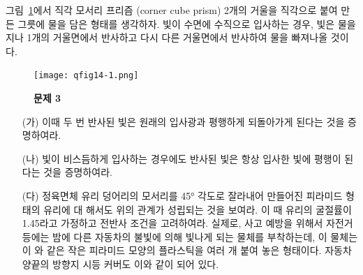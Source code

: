 \documentclass[tightenlines,floatfix,nofootinbib,superscriptaddress,fleqn]{revtex4-2}
\begin{document}
그림~\ref{fig:1}에서 직각 모서리 프리즘 (corner cube prism) 2개의 거울을
직각으로 붙여 만든 그릇에 물을 담은 형태를 생각하자. 빛이 수면에
수직으로 입사하는 경우, 빛은 물을 지나 1개의 거울면에서 반사하고 다시
다른 거울면에서 반사하여 물을 빠져나올 것이다.
 \begin{figure}[htp]
   \centering
   \texttt{[image: qfig14-1.png]}
   \caption{\textbf{문제 3}}
   \label{fig:1}
 \end{figure}
\begin{itemize}
\item[(가)] 이때 두 번 반사된 빛은 원래의 입사광과 평행하게 되돌아가게
  된다는 것을 증명하여라.
\item[(나)] 빛이 비스듬하게 입사하는 경우에도 반사된 빛은 항상 입사한
  빛에 평행이 된다는 것을 증명하여라.
\item[(다)] 정육면체 유리 덩어리의 모서리를 45° 각도로 잘라내어
  만들어진 피라미드 형태의 유리에 대 해서도 위의 관계가 성립되는 것을
  보여라. 이 때 유리의 굴절률이 1.45라고 가정하고 전반사 조건을
  고려하여라. 실제로, 사고 예방을 위해서 자전거 등에는 밤에 다른
  자동차의 불빛에 의해 빛나게 되는 물체를 부착하는데, 이 물체는 이 와
  같은 작은 피라미드 모양의 플라스틱을 여러 개 붙여 놓은
  형태이다. 자동차 양끝의 방향지 시등 커버도 이와 같이 되어 있다.  
\end{itemize}
\end{document}
